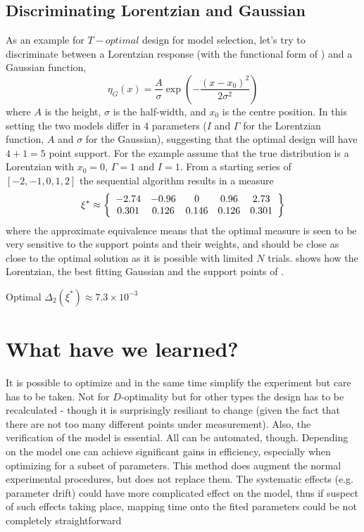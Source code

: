 \documentclass[12pt]{iopart}
\begin{document}
\subsection{Discriminating Lorentzian and Gaussian}

As an example for $T-optimal$ design for model selection, let's try to discriminate between a Lorentzian response (with the functional form of ) and a Gaussian function,
\begin{equation}
\eta_G(x) = \frac{A}{\sigma} \exp\left(-\frac{(x-x_0)^2}{2 \sigma^2}\right)
\label{eq:gauss}
\end{equation}
where $A$ is the height, $\sigma$ is the half-width, and $x_0$ is the centre position. In this setting the two models differ in 4 parameters ($I$ and $\Gamma$ for the Lorentzian function, $A$ and $\sigma$ for the Gaussian), suggesting that the optimal design will have $4+1=5$ point support. For the example assume that the true distribution is a Lorentzian with $x_0 = 0$, $\Gamma = 1$  and $I = 1$. From a starting series of $[-2, -1, 0, 1, 2]$ the sequential algorithm results in a measure
\begin{equation}
\xi^* \approx \left\{
  \begin{array}{c c c c c}
    -2.74 & -0.96 & 0 & 0.96 & 2.73\\
    0.301 & 0.126 & 0.146 & 0.126 & 0.301\\
  \end{array} \right \}
\label{eq:lorgauss}
\end{equation}
where the approximate equivalence means that the optimal measure is seen to be very sensitive to the support points and their weights, and  should be close as close to the optimal solution as it is possible with limited $N$ trials.  shows how the Lorentzian, the best fitting Gaussian and the support points of .


Optimal $\Delta_2(\xi^*) \approx 7.3 \times 10^{-3}$

\section{What have we learned?}

It is possible to optimize and in the same time simplify the experiment but care has to be taken. Not for $D$-optimality but for other types the design has to be recalculated - though it is surprisingly resiliant to change (given the fact that there are not too many different points under measurement). Also, the verification of the model is essential. All can be automated, though. Depending on the model one can achieve significant gains in efficiency, especially when optimizing for a subset of parameters. This method does augment the normal experimental procedures, but does not replace them. The systematic effects (e.g. parameter drift) could have more complicated effect on the model, thus if suspect of such effects taking place, mapping time onto the fited parameters could be not completely straightforward
\end{document}

